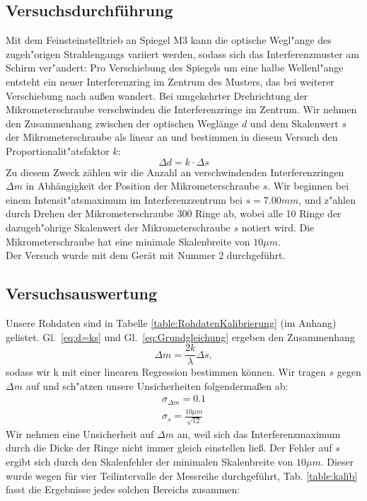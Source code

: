 \documentclass[12pt,a4paper]{article}
\begin{document}
\subsection{Versuchsdurchführung}
Mit dem Feinsteinstelltrieb an Spiegel M3 kann die optische Wegl"ange des zugeh"origen Strahlengangs variiert werden, sodass sich das Interferenzmuster am Schirm ver"andert: Pro Verschiebung des Spiegels um eine halbe Wellenl"ange entsteht ein neuer Interferenzring im Zentrum des Musters, das bei weiterer Verschiebung nach au\ss en wandert. Bei umgekehrter Drehrichtung der Mikrometerschraube verschwinden die Interferenzringe im Zentrum. Wir nehmen den Zusammenhang zwischen der optischen Weglänge $d$ und dem Skalenwert $s$ der Mikrometerschraube als linear an und bestimmen in diesem Versuch den Proportionalit"atsfaktor $k$:
\begin{equation}\label{eq:d=ks}
\Delta d=k\cdot \Delta s
\end{equation}
Zu diesem Zweck zählen wir die Anzahl an verschwindenden Interferenzringen $\Delta m$ in Abhängigkeit der Position der Mikrometerschraube $s$.
Wir beginnen bei einem Intensit"atsmaximum im Interferenzzentrum bei $s=7.00mm$, und z"ahlen durch Drehen der Mikrometerschraube 300 Ringe ab, wobei alle 10 Ringe der dazugeh"ohrige Skalenwert der Mikrometerschraube $s$ notiert wird. Die Mikrometerschraube hat eine minimale Skalenbreite von $10\mu m$.\\
Der Versuch wurde mit dem Gerät mit Nummer 2 durchgeführt.

\subsection{Versuchsauswertung}
Unsere Rohdaten sind in Tabelle \ref{table:RohdatenKalibrierung} (im Anhang) gelistet.
Gl.~\eqref{eq:d=ks} und Gl.~\eqref{eq:Grundgleichung} ergeben den Zusammenhang
\begin{equation}
\Delta m = \frac{2k}{\lambda}\Delta s,
\end{equation}
sodass wir k mit einer linearen Regression bestimmen können. Wir tragen $s$ gegen $\Delta m$ auf und sch"atzen unsere Unsicherheiten folgendermaßen ab:
\begin{align}\label{eq:Unsicherheit_Kalibrierung}
\sigma_{\Delta m}=0.1\\
\sigma_s=\frac{10\mu m}{\sqrt{12}}
\end{align}
Wir nehmen eine Unsicherheit auf $\Delta m$ an, weil sich das Interferenzmaximum durch die Dicke der Ringe nicht immer gleich einstellen lie\ss. Der Fehler auf $s$ ergibt sich durch den Skalenfehler der minimalen Skalenbreite von $10\mu m$. Dieser wurde wegen für vier Teilintervalle der Messreihe durchgeführt, Tab. \ref{table:kalib} fasst die Ergebnisse jedes solchen Bereichs zusammen:\\
\end{document}
